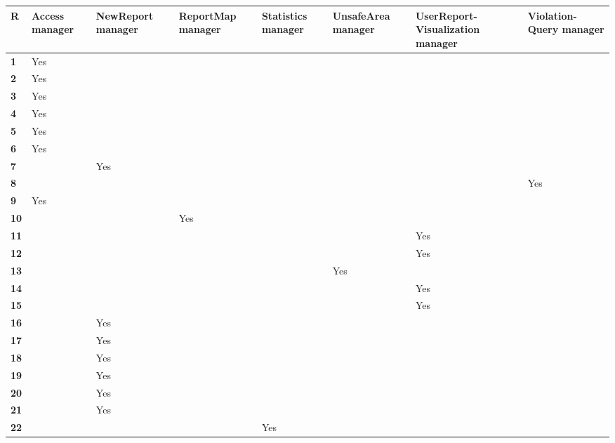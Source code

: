 \documentclass[../RASD.tex]{subfiles}
\begin{document}
    \newpage
        \begin{longtable}{| p{.02\linewidth} | p{.10\linewidth} | p{.14\linewidth} | p{.14\linewidth} | p{.105\linewidth} | p{.14\linewidth} |
        p{.17\linewidth} | p{.12\linewidth} |}
            \hline
            \textbf{R} & \textbf{Access manager} & \textbf{NewReport manager} & \textbf{ReportMap manager} & \textbf{Statistics manager} &
            \textbf{UnsafeArea manager} & \textbf{UserReport- Visualization manager} & \textbf{Violation- Query manager}\\ \hline
            \textbf{1} & Yes & & & & & & \\ \hline
            \textbf{2} & Yes & & & & & & \\ \hline
            \textbf{3} & Yes & & & & & & \\ \hline
            \textbf{4} & Yes & & & & & & \\ \hline
            \textbf{5} & Yes & & & & & & \\ \hline
            \textbf{6} & Yes & & & & & & \\ \hline
            \textbf{7} & & Yes & & & & & \\ \hline
            \textbf{8} & & & & & & & Yes\\ \hline
            \textbf{9} & Yes & & & & & & \\ \hline
            \textbf{10} & & & Yes & & & & \\ \hline
            \textbf{11} & & & & & & Yes & \\ \hline
            \textbf{12} & & & & & & Yes & \\ \hline
            \textbf{13} & & & & & Yes & & \\ \hline
            \textbf{14} & & & & & & Yes & \\ \hline
            \textbf{15} & & & & & & Yes & \\ \hline
            \textbf{16} & & Yes & & & & & \\ \hline
            \textbf{17} & & Yes & & & & & \\ \hline
            \textbf{18} & & Yes & & & & & \\ \hline
            \textbf{19} & & Yes & & & & & \\ \hline
            \textbf{20} & & Yes & & & & & \\ \hline
            \textbf{21} & & Yes & & & & & \\ \hline
            \textbf{22} & & & & Yes & & & \\ \hline

\end{longtable}
\end{document}
